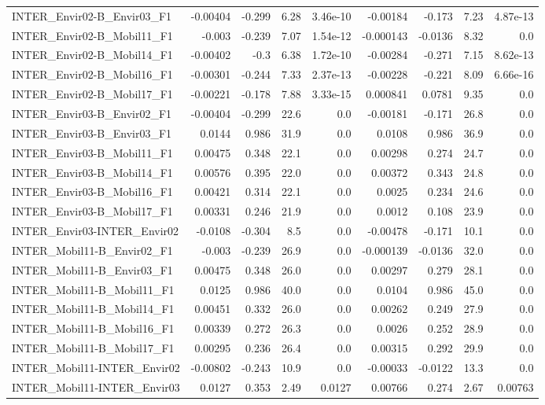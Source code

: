 \begin{tabular}{lrrrrrrrr}
INTER_Envir02-B_Envir03_F1 & -0.00404 & -0.299 & 6.28 & 3.46e-10 & -0.00184 & -0.173 & 7.23 & 4.87e-13 \\
INTER_Envir02-B_Mobil11_F1 & -0.003 & -0.239 & 7.07 & 1.54e-12 & -0.000143 & -0.0136 & 8.32 & 0.0 \\
INTER_Envir02-B_Mobil14_F1 & -0.00402 & -0.3 & 6.38 & 1.72e-10 & -0.00284 & -0.271 & 7.15 & 8.62e-13 \\
INTER_Envir02-B_Mobil16_F1 & -0.00301 & -0.244 & 7.33 & 2.37e-13 & -0.00228 & -0.221 & 8.09 & 6.66e-16 \\
INTER_Envir02-B_Mobil17_F1 & -0.00221 & -0.178 & 7.88 & 3.33e-15 & 0.000841 & 0.0781 & 9.35 & 0.0 \\
INTER_Envir03-B_Envir02_F1 & -0.00404 & -0.299 & 22.6 & 0.0 & -0.00181 & -0.171 & 26.8 & 0.0 \\
INTER_Envir03-B_Envir03_F1 & 0.0144 & 0.986 & 31.9 & 0.0 & 0.0108 & 0.986 & 36.9 & 0.0 \\
INTER_Envir03-B_Mobil11_F1 & 0.00475 & 0.348 & 22.1 & 0.0 & 0.00298 & 0.274 & 24.7 & 0.0 \\
INTER_Envir03-B_Mobil14_F1 & 0.00576 & 0.395 & 22.0 & 0.0 & 0.00372 & 0.343 & 24.8 & 0.0 \\
INTER_Envir03-B_Mobil16_F1 & 0.00421 & 0.314 & 22.1 & 0.0 & 0.0025 & 0.234 & 24.6 & 0.0 \\
INTER_Envir03-B_Mobil17_F1 & 0.00331 & 0.246 & 21.9 & 0.0 & 0.0012 & 0.108 & 23.9 & 0.0 \\
INTER_Envir03-INTER_Envir02 & -0.0108 & -0.304 & 8.5 & 0.0 & -0.00478 & -0.171 & 10.1 & 0.0 \\
INTER_Mobil11-B_Envir02_F1 & -0.003 & -0.239 & 26.9 & 0.0 & -0.000139 & -0.0136 & 32.0 & 0.0 \\
INTER_Mobil11-B_Envir03_F1 & 0.00475 & 0.348 & 26.0 & 0.0 & 0.00297 & 0.279 & 28.1 & 0.0 \\
INTER_Mobil11-B_Mobil11_F1 & 0.0125 & 0.986 & 40.0 & 0.0 & 0.0104 & 0.986 & 45.0 & 0.0 \\
INTER_Mobil11-B_Mobil14_F1 & 0.00451 & 0.332 & 26.0 & 0.0 & 0.00262 & 0.249 & 27.9 & 0.0 \\
INTER_Mobil11-B_Mobil16_F1 & 0.00339 & 0.272 & 26.3 & 0.0 & 0.0026 & 0.252 & 28.9 & 0.0 \\
INTER_Mobil11-B_Mobil17_F1 & 0.00295 & 0.236 & 26.4 & 0.0 & 0.00315 & 0.292 & 29.9 & 0.0 \\
INTER_Mobil11-INTER_Envir02 & -0.00802 & -0.243 & 10.9 & 0.0 & -0.00033 & -0.0122 & 13.3 & 0.0 \\
INTER_Mobil11-INTER_Envir03 & 0.0127 & 0.353 & 2.49 & 0.0127 & 0.00766 & 0.274 & 2.67 & 0.00763 \\

\end{tabular}
